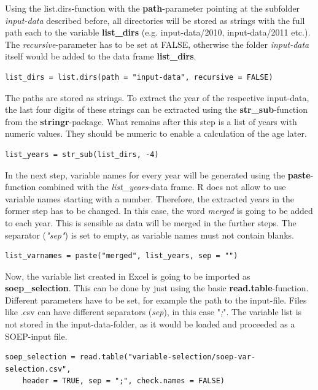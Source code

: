 \documentclass[a4paper]{article}
\begin{document}
Using the list.dirs-function with the \textbf{path}-parameter pointing at the subfolder \textit{input-data} described before, all directories will be stored as strings with the full path each to the variable \textbf{list\_dirs} (e.g. input-data/2010, input-data/2011 etc.).
The \textit{recursive}-parameter has to be set at FALSE, otherwise the folder \textit{input-data} itself would be added to the data frame \textbf{list\_dirs}.
\begin{lstlisting}[firstnumber=16]
list_dirs = list.dirs(path = "input-data", recursive = FALSE)
\end{lstlisting}

The paths are stored as strings. To extract the year of the respective input-data, the last four digits of these strings can be extracted using the \textbf{str\_sub}-function from the \textbf{stringr}-package. What remains after this step is a list of years with numeric values. They should be numeric to enable a calculation of the age later.
\begin{lstlisting}[firstnumber=18]
list_years = str_sub(list_dirs, -4)
\end{lstlisting}

In the next step, variable names for every year will be generated using the \textbf{paste}-function combined with the \textit{list\_years}-data frame. R does not allow to use variable names starting with a number. Therefore, the extracted years in the former step has to be changed. In this case, the word \textit{merged} is going to be added to each year. This is sensible as data will be merged in the further steps. The separator (\textit{"sep"}) is set to empty, as variable names must not contain blanks.
\begin{lstlisting}[firstnumber=20]
list_varnames = paste("merged", list_years, sep = "")
\end{lstlisting}

Now, the variable list created in Excel is going to be imported as \textbf{soep\_selection}. This can be done by just using the basic \textbf{read.table}-function. Different parameters have to be set, for example the path to the input-file. Files like .csv can have different separators (\textit{sep}), in this case "\textit{;}". The variable list is not stored in the input-data-folder, as it would be loaded and proceeded as a SOEP-input file.
\begin{lstlisting}[firstnumber=22]
soep_selection = read.table("variable-selection/soep-var-selection.csv", 
	header = TRUE, sep = ";", check.names = FALSE)
\end{lstlisting}
\end{document}
